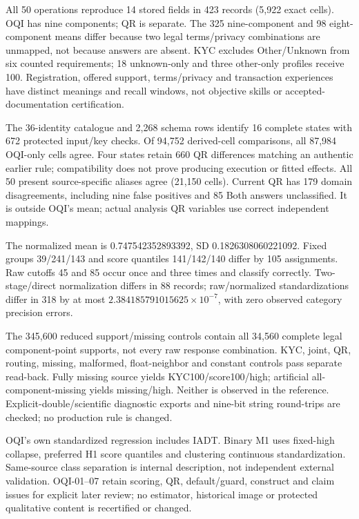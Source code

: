 \documentclass[11pt,a4paper]{article}
\begin{document}
All 50 operations reproduce 14 stored fields in 423 records (5,922 exact cells).
OQI has nine components; QR is separate. The 325 nine-component and 98
eight-component means differ because two legal terms/privacy combinations are
unmapped, not because answers are absent. KYC excludes Other/Unknown from six
counted requirements; 18 unknown-only and three other-only profiles receive 100.
Registration, offered support, terms/privacy and transaction experiences have
distinct meanings and recall windows, not objective skills or accepted-documentation
certification.

The 36-identity catalogue and 2,268 schema rows identify 16 complete states with
672 protected input/key checks. Of 94,752 derived-cell comparisons, all 87,984
OQI-only cells agree. Four states retain 660 QR differences matching an authentic
earlier rule; compatibility does not prove producing execution or fitted effects.
All 50 present source-specific aliases agree (21,150 cells). Current QR has
179 domain disagreements, including nine false positives and 85 Both answers
unclassified. It is outside OQI's mean; actual analysis QR variables use correct
independent mappings.

The normalized mean is 0.747542352893392, SD 0.1826308060221092. Fixed groups
39/241/143 and score quantiles 141/142/140 differ by 105 assignments. Raw cutoffs
45 and 85 occur once and three times and classify correctly. Two-stage/direct
normalization differs in 88 records; raw/normalized standardizations differ in
318 by at most \(2.384185791015625\times10^{-7}\), with zero observed category
precision errors.

The 345,600 reduced support/missing controls contain all 34,560 complete legal
component-point supports, not every raw response combination. KYC, joint, QR,
routing, missing, malformed, float-neighbor and constant controls pass separate
read-back. Fully missing source yields KYC100/score100/high; artificial
all-component-missing yields missing/high. Neither is observed in the reference.
Explicit-double/scientific diagnostic exports and nine-bit string round-trips
are checked; no production rule is changed.

OQI's own standardized regression includes IADT. Binary M1 uses fixed-high collapse,
preferred H1 score quantiles and clustering continuous standardization. Same-source
class separation is internal description, not independent external validation.
OQI-01--07 retain scoring, QR, default/guard, construct and claim issues for explicit
later review; no estimator, historical image or protected qualitative content is
recertified or changed.
\end{document}
